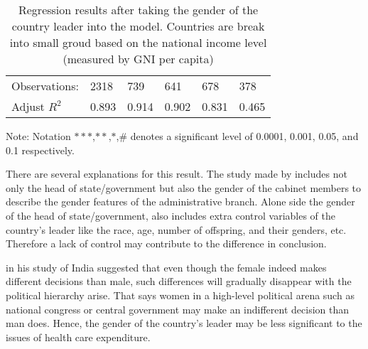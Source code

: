 \begin{table}[]
\begin{tabular}{l|lllll}
Observations:                   & 2318                                                               & 739                                                                & 641                                                              & 678                                                              & 378                                                               \\
Adjust $R^2$                    & 0.893                                                              & 0.914                                                              & 0.902                                                            & 0.831                                                            & 0.465                                                             \\ \hline
\end{tabular}
\begin{tablenotes}
\small
      \item Note: Notation $***$,$**$,$*$,$\#$ denotes a significant level of 0.0001, 0.001, 0.05, and 0.1 respectively.
    \end{tablenotes}
    \caption{Regression results after taking the gender of the country leader into the model. Countries are break into small groud based on the national income level (measured by GNI per capita) }
    \label{leader}
\end{table}


There are several explanations for this result.
The study made by  includes not only the head of state/government but also the gender of the cabinet members to describe the gender features of the administrative branch.
Alone side the gender of the head of state/government, \citeauthor{Mavisakalyan2014} also includes extra control variables of the country's leader like the race, age, number of offspring, and their genders, etc. 
Therefore a lack of control may contribute to the difference in conclusion.

 in his study of India suggested that even though the female indeed makes different decisions than male, such differences will gradually disappear with the political hierarchy arise.
That says women in a high-level political arena such as national congress or central government may make an indifferent decision than man does.
Hence, the gender of the country's leader may be less significant to the issues of health care expenditure. 


